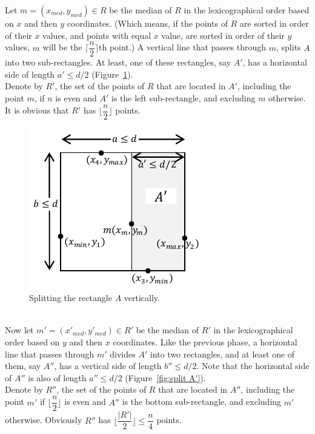 \documentclass[review]{elsarticle}
\begin{document}
Let ${ m=(x_{med},y_{med})\in R }$ be the median of $R$ in the lexicographical order based on $x$ and then $y$ coordinates. (Which means, if the points of $R$ are sorted in order of their $x$ values, and points with equal $x$ value, are sorted in order of their $y$ values, $m$ will be the ${ \lceil\dfrac{n}{2}\rceil }$th point.) A vertical line that passes through $m$, splits $A$ into two sub-rectangles. At least, one of these rectangles, say $A'$, has a horizontal side of length ${ a' \leq d/2 }$ (Figure~\ref{fig:split A}).\\
Denote by $R'$, the set of the points of $R$ that are located in $A'$, including the point $m$, if $n$ is even and $A'$ is the left sub-rectangle, and excluding $m$ otherwise. It is obvious that $R'$ has ${ \lfloor\dfrac{n}{2}\rfloor }$ points.
\begin{figure} [h]
  \centering
  \includegraphics[scale=1]{Figs/fig4.pdf}
  \vspace{-15pt}
  \caption{Splitting the rectangle $A$ vertically.}
  \label{fig:split A}
\end{figure}\\
Now let ${ m'=( x'_{med}, y'_{med})\in R' }$ be the median of $R'$ in the lexicographical order based on $y$ and then $x$ coordinates. Like the previous phase, a horizontal line that passes through $m'$ divides $A'$ into two rectangles, and at least one of them, say $A''$, has a vertical side of length ${ b'' \leq d/2 }$. Note that the horizontal side of $A''$ is also of length ${ a'' \leq d/2 }$ (Figure~\ref{fig:split A'}).\\
Denote by $R''$, the set of the points of $R$ that are located in $A''$, including the point $m'$ if ${ \lfloor\dfrac{n}{2}\rfloor }$ is even and $A''$ is the bottom sub-rectangle, and excluding $m'$ otherwise. Obviously $R''$ has ${ \big\lfloor\dfrac{|R'|}{2}\big\rfloor \le \dfrac{n}{4} }$ points.
\end{document}
